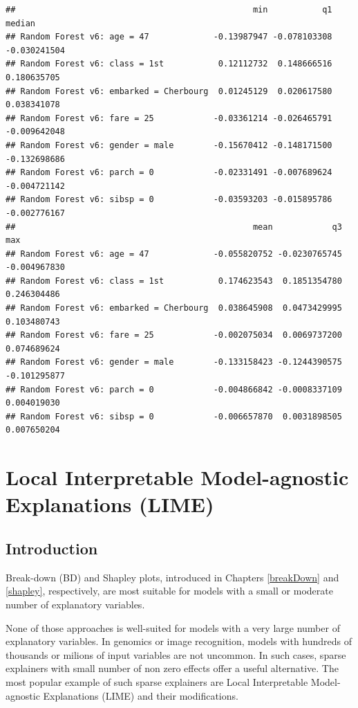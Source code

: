 \documentclass[12pt,]{krantz}
\begin{document}
\begin{verbatim}
##                                                min           q1       median
## Random Forest v6: age = 47             -0.13987947 -0.078103308 -0.030241504
## Random Forest v6: class = 1st           0.12112732  0.148666516  0.180635705
## Random Forest v6: embarked = Cherbourg  0.01245129  0.020617580  0.038341078
## Random Forest v6: fare = 25            -0.03361214 -0.026465791 -0.009642048
## Random Forest v6: gender = male        -0.15670412 -0.148171500 -0.132698686
## Random Forest v6: parch = 0            -0.02331491 -0.007689624 -0.004721142
## Random Forest v6: sibsp = 0            -0.03593203 -0.015895786 -0.002776167
##                                                mean            q3          max
## Random Forest v6: age = 47             -0.055820752 -0.0230765745 -0.004967830
## Random Forest v6: class = 1st           0.174623543  0.1851354780  0.246304486
## Random Forest v6: embarked = Cherbourg  0.038645908  0.0473429995  0.103480743
## Random Forest v6: fare = 25            -0.002075034  0.0069737200  0.074689624
## Random Forest v6: gender = male        -0.133158423 -0.1244390575 -0.101295877
## Random Forest v6: parch = 0            -0.004866842 -0.0008337109  0.004019030
## Random Forest v6: sibsp = 0            -0.006657870  0.0031898505  0.007650204
\end{verbatim}

\hypertarget{LIME}{%
\section{Local Interpretable Model-agnostic Explanations (LIME)}\label{LIME}}

\hypertarget{LIMEIntroduction}{%
\subsection{Introduction}\label{LIMEIntroduction}}

Break-down (BD) and Shapley plots, introduced in Chapters \ref{breakDown} and \ref{shapley}, respectively, are most suitable for models with a small or moderate number of explanatory variables.

None of those approaches is well-suited for models with a very large number of explanatory variables. In genomics or image recognition, models with hundreds of thousands or milions of input variables are not uncommon. In such cases, sparse explainers with small number of non zero effects offer a useful alternative. The most popular example of such sparse explainers are Local Interpretable Model-agnostic Explanations (LIME) and their modifications.
\end{document}
